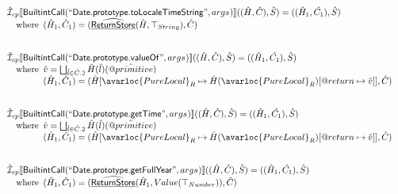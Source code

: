 \[\begin{array}{l}
\aI _{cp}\lbr \SF{BuiltintCall}(``\SF{Date.prototype.toLocaleTimeString}",args_{})\rbr((\hat{H},\hat{C}), \hat{S})
  = ((\hat{H}_1, \hat{C_1}), \hat{S})\\
\quad\wherec{
  (\hat{H}_1, \hat{C}_1) = (\ahf{ReturnStore}(\hat{H},\top_{String}), \hat{C})\\
  }\\
\\\\

\aI _{cp}\lbr \SF{BuiltintCall}(``\SF{Date.prototype.valueOf}",args_{})\rbr((\hat{H},\hat{C}), \hat{S})
  = ((\hat{H}_1, \hat{C_1}), \hat{S})\\
\quad\wherec{
  \hat{v} = \bigsqcup_{\hat{l} \in \hat{C}.2} \hat{H}(\hat{l})(\avarprop{primitive})\\
  (\hat{H}_1, \hat{C}_1) = 
    (\hat{H}[\avarloc{PureLocal}_R \mapsto \hat{H}(\avarloc{PureLocal}_R)
      [\varprop{return} \mapsto \hat{v}]], \hat{C})\\
  }\\
\\\\

\aI _{cp}\lbr \SF{BuiltintCall}(``\SF{Date.prototype.getTime}",args_{})\rbr((\hat{H},\hat{C}), \hat{S})
  = ((\hat{H}_1, \hat{C_1}), \hat{S})\\
\quad\wherec{
  \hat{v} = \bigsqcup_{\hat{l} \in \hat{C}.2} \hat{H}(\hat{l})(\avarprop{primitive})\\
  (\hat{H}_1, \hat{C}_1) = 
    (\hat{H}[\avarloc{PureLocal}_R \mapsto \hat{H}(\avarloc{PureLocal}_R)
      [\varprop{return} \mapsto \hat{v}]], \hat{C})\\
  }\\
\\\\


\aI _{cp}\lbr \SF{BuiltintCall}(``\SF{Date.prototype.getFullYear}",args_{})\rbr((\hat{H},\hat{C}), \hat{S})
  = ((\hat{H}_1, \hat{C_1}), \hat{S})\\
\quad\wherec{ 
  (\hat{H}_1, \hat{C}_1) = (\ahf{ReturnStore}(\hat{H}_1, Value(\top_{Number})), \hat{C})
  }\\
\\\\



\end{array}\]
